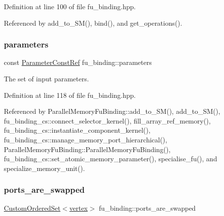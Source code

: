 Definition at line 100 of file fu\+\_\+binding.\+hpp.



Referenced by add\+\_\+to\+\_\+\+S\+M(), bind(), and get\+\_\+operations().

\mbox{\label{classfu__binding_aa372286fd7ddc5ce6424afba333bb80a}} 
\subsubsection{\texorpdfstring{parameters}{parameters}}
{\footnotesize\ttfamily const \hyperlink{Parameter_8hpp_a37841774a6fcb479b597fdf8955eb4ea}{Parameter\+Const\+Ref} fu\+\_\+binding\+::parameters\hspace{0.3cm}{\ttfamily [protected]}}



The set of input parameters. 



Definition at line 118 of file fu\+\_\+binding.\+hpp.



Referenced by Parallel\+Memory\+Fu\+Binding\+::add\+\_\+to\+\_\+\+S\+M(), add\+\_\+to\+\_\+\+S\+M(), fu\+\_\+binding\+\_\+cs\+::connect\+\_\+selector\+\_\+kernel(), fill\+\_\+array\+\_\+ref\+\_\+memory(), fu\+\_\+binding\+\_\+cs\+::instantiate\+\_\+component\+\_\+kernel(), fu\+\_\+binding\+\_\+cs\+::manage\+\_\+memory\+\_\+port\+\_\+hierarchical(), Parallel\+Memory\+Fu\+Binding\+::\+Parallel\+Memory\+Fu\+Binding(), fu\+\_\+binding\+\_\+cs\+::set\+\_\+atomic\+\_\+memory\+\_\+parameter(), specialise\+\_\+fu(), and specialize\+\_\+memory\+\_\+unit().

\mbox{\label{classfu__binding_a9e77e56499e883cc67585bc3f943e249}} 
\subsubsection{\texorpdfstring{ports\+\_\+are\+\_\+swapped}{ports\_are\_swapped}}
{\footnotesize\ttfamily \hyperlink{classCustomOrderedSet}{Custom\+Ordered\+Set}$<$\hyperlink{graph_8hpp_abefdcf0544e601805af44eca032cca14}{vertex}$>$ fu\+\_\+binding\+::ports\+\_\+are\+\_\+swapped\hspace{0.3cm}{\ttfamily [protected]}}



